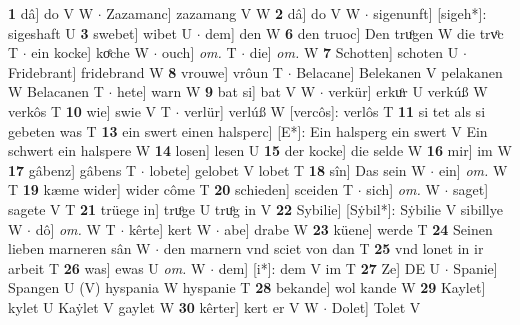 \documentclass[8pt,a4paper,notitlepage]{article}
\begin{document}
\begin{table}[ht]
\begin{minipage}[t]{0.5\linewidth}
\textbf{1} dâ] do V W  $\cdot$ Zazamanc] zazamang V W \textbf{2} dâ] do V W  $\cdot$ sigenunft] [sigeh*]: sigeshaft U \textbf{3} swebet] wibet U  $\cdot$ dem] den W \textbf{6} den truoc] Den truͦgen W die trvͦc T  $\cdot$ ein kocke] koͤche W  $\cdot$ ouch] \textit{om.} T  $\cdot$ die] \textit{om.} W \textbf{7} Schotten] schoten U  $\cdot$ Fridebrant] fridebrand W \textbf{8} vrouwe] vrôun T  $\cdot$ Belacane] Belekanen V pelakanen W Belacanen T  $\cdot$ hete] warn W \textbf{9} bat si] bat V W  $\cdot$ verkür] erkuͦr U verkúß W verkôs T \textbf{10} wie] swie V T  $\cdot$ verlür] verlúß W [vercôs]: verlôs T \textbf{11} si tet als si gebeten was T \textbf{13} ein swert einen halsperc] [E*]: Ein halsperg ein swert V Ein schwert ein halspere W \textbf{14} losen] lesen U \textbf{15} der kocke] die selde W \textbf{16} mir] im W \textbf{17} gâbenz] gâbens T  $\cdot$ lobete] gelobet V lobet T \textbf{18} sîn] Das sein W  $\cdot$ ein] \textit{om.} W T \textbf{19} kæme wider] wider côme T \textbf{20} schieden] sceiden T  $\cdot$ sich] \textit{om.} W  $\cdot$ saget] sagete V T \textbf{21} trüege in] truͦge U truͦg in V \textbf{22} Sybilie] [Sẏbil*]: Sẏbilie V sibillye W  $\cdot$ dô] \textit{om.} W T  $\cdot$ kêrte] kert W  $\cdot$ abe] drabe W \textbf{23} küene] werde T \textbf{24} Seinen lieben marneren sân W  $\cdot$ den marnern vnd sciet von dan T \textbf{25} vnd lonet in ir arbeit T \textbf{26} was] ewas U \textit{om.} W  $\cdot$ dem] [i*]: dem V im T \textbf{27} Ze] DE U  $\cdot$ Spanie] Spangen U (V) hyspania W hyspanie T \textbf{28} bekande] wol kande W \textbf{29} Kaylet] kylet U Kaẏlet V gaylet W \textbf{30} kêrter] kert er V W  $\cdot$ Dolet] Tolet V \newline
\end{minipage}
\end{table}
\end{document}
